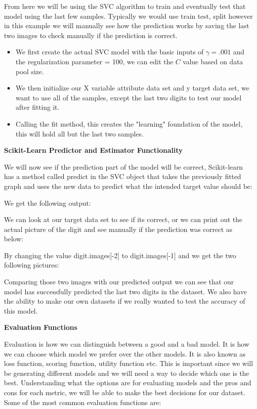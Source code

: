 \documentclass[a4paper,12pt]{report}
\newcommand{\msection}[1]{\noindent\textbf{#1}}
\begin{document}
From here we will be using the SVC algorithm to train and eventually test that model using the last few samples. Typically we would use train test, split however in this example we will manually see how the prediction works by saving the last two images to check manually if the prediction is correct.

\begin{itemize}[,]
    \setlength\itemsep{-.1cm}
    \item We first create the actual SVC model with the basic inputs of $\gamma = .001$ and the regularization parameter = 100, we can edit the $C$ value based on data pool size.
    \item We then initialize our X variable attribute data set and y target data set, we want to use all of the samples, except the last two digits to test our model after fitting it.
    \item Calling the fit method, this creates the "learning" foundation of the model, this will hold all but the last two samples.
\end{itemize}

\msection{Scikit-Learn Predictor and Estimator Functionality}

We will now see if the prediction part of the model will be correct, Scikit-learn has a method called predict in the SVC object that takes the previously fitted graph and uses the new data to predict what the intended target value should be:


We get the following output:


We can look at our target data set to see if its correct, or we can print out the actual picture of the digit and see manually if the prediction was correct as below:


By changing the value digit.images[-2] to digit.images[-1] and we get the two following pictures:


Comparing those two images with our predicted output we can see that our model has successfully predicted the last two digits in the dataset. We also have the ability to make our own datasets if we really wanted to test the accuracy of this model.

\msection{Evaluation Functions}

Evaluation is how we can distinguish between a good and a bad model. It is how we can choose which model we prefer over the other models. It is also known as loss function, scoring function, utility function etc. This is important since we will be generating different models and we will need a way to decide which one is the best. Understanding what the options are for evaluating models and the pros and cons for each metric, we will be able to make the best decisions for our dataset. Some of the most common evaluation functions are:
\end{document}
